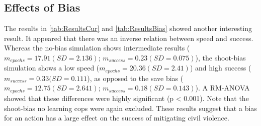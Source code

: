 \subsection{Effects of Bias}
The results in \autoref{tab:ResultsCur} and \autoref{tab:ResultsBias} showed another interesting result. It appeared that there was an inverse relation between speed and success. Whereas the no-bias simulation shows intermediate results ($m_{epochs} = 17.91 (SD = 2.136)$; $m_{success} = 0.23 (SD = 0.075) $), the shoot-bias simulation shows a low speed ($m_{epochs} = 20.36 (SD = 2.41)$) and high success ($m_{success} = 0.33 (SD = 0.111$), as opposed to the save bias ($m_{epochs} = 12.75 (SD = 2.641)$; $m_{success} = 0.18 (SD = 0.143)$). A RM-ANOVA showed that these differences were highly significant (p < 0.001). Note that the shoot-bias no learning cops were again excluded. These results suggest that a bias for an action has a large effect on the success of mitigating civil violence. 
